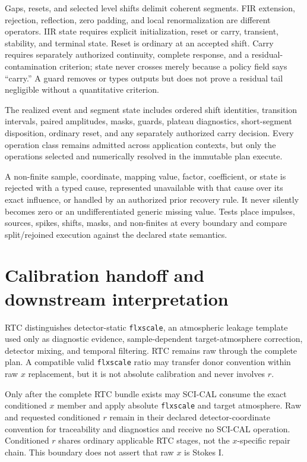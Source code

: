\documentclass[10pt]{article}
\begin{document}
Gaps, resets, and selected level shifts delimit coherent segments.  FIR
extension, rejection, reflection, zero padding, and local renormalization are
different operators.  IIR state requires explicit initialization, reset or
carry, transient, stability, and terminal state.  Reset is ordinary at an
accepted shift.  Carry requires separately authorized continuity, complete
response, and a residual-contamination criterion; state never crosses merely
because a policy field says ``carry.''  A guard removes or types outputs but does
not prove a residual tail negligible without a quantitative criterion.

The realized event and segment state includes ordered shift identities,
transition intervals, paired amplitudes, masks, guards, plateau diagnostics,
short-segment disposition, ordinary reset, and any separately authorized carry
decision.  Every operation class remains admitted across application contexts,
but only the operations selected and numerically resolved in the immutable plan
execute.

A non-finite sample, coordinate, mapping value, factor, coefficient, or state
is rejected with a typed cause, represented unavailable with that cause over
its exact influence, or handled by an authorized prior recovery rule.  It
never silently becomes zero or an undifferentiated generic missing value.  Tests
place impulses, sources, spikes, shifts, masks, and non-finites at every
boundary and compare split/rejoined execution against the declared state
semantics.

\section{Calibration handoff and downstream interpretation}
\label{sec:rat-calibration}
RTC distinguishes detector-static \texttt{flxscale}, an atmospheric leakage
template used only as diagnostic evidence, sample-dependent target-atmosphere
correction, detector mixing, and temporal filtering.  RTC remains raw through
the complete plan.  A compatible
valid \texttt{flxscale} ratio may transfer donor convention within raw $x$
replacement, but it is not absolute calibration and never involves $r$.

Only after the complete RTC bundle exists may SCI-CAL consume the exact
conditioned $x$ member and apply absolute \texttt{flxscale} and target
atmosphere.  Raw and requested conditioned $r$ remain in their declared
detector-coordinate convention for traceability and diagnostics and receive
no SCI-CAL operation.  Conditioned $r$ shares ordinary applicable RTC stages,
not the $x$-specific repair chain.  This boundary does not assert that raw
$x$ is Stokes I.
\end{document}
